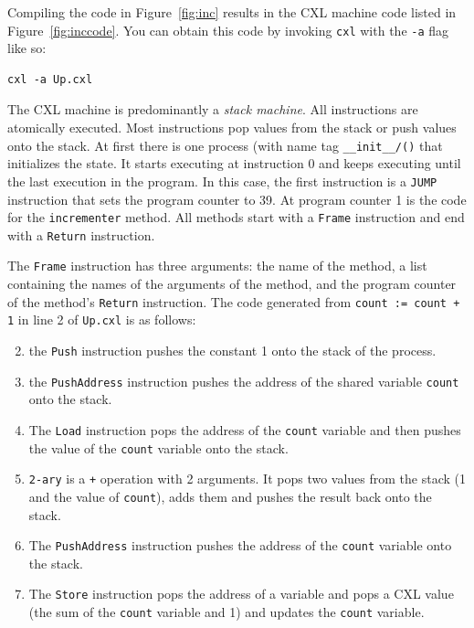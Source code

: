 \documentclass{report}
\newenvironment{code}{
\tcolorbox
}{
\endtcolorbox
}
\begin{document}
Compiling the code in Figure~\ref{fig:inc} results in the CXL machine code
listed in Figure~\ref{fig:inccode}.
You can obtain this code by invoking \texttt{cxl} with the \texttt{-a} flag
like so:
\begin{code}
\begin{verbatim}
cxl -a Up.cxl
\end{verbatim}
\end{code}
The CXL machine is predominantly a \emph{stack machine}.
All instructions are atomically executed.
Most instructions pop values from the stack or push values onto the stack.
At first there is one process (with name tag \texttt{\_\_init\_\_/()}
that initializes the state.
It starts executing at instruction 0 and keeps executing until the last
execution in the program.
In this case, the first instruction is a \texttt{JUMP} instruction that sets the
program counter to 39.
At program counter 1 is the code for the \texttt{incrementer} method.
All methods start with a \texttt{Frame} instruction and end with a \texttt{Return}
instruction.

The \texttt{Frame} instruction has three arguments: the name of the method,
a list containing the names of the arguments of the method, and
the program counter of the method's \texttt{Return} instruction.
The code generated from \texttt{count := count + 1} in line 2 of
\texttt{Up.cxl} is as follows:

\begin{enumerate} \setcounter{enumi}{1}
\item the \texttt{Push} instruction pushes the constant 1
onto the stack of the process.
\item the \texttt{PushAddress} instruction pushes the address of
the shared variable \texttt{count} onto the stack.
\item The \texttt{Load} instruction pops the address of the
\texttt{count} variable and then pushes the value of the
\texttt{count} variable onto the stack.
\item \texttt{2-ary} is a \texttt{+} operation with 2 arguments.
It pops two values from the stack (1 and the value of \texttt{count}),
adds them and pushes the result back onto the stack.
\item The \texttt{PushAddress} instruction pushes the address of the \texttt{count}
variable onto the stack.
\item The \texttt{Store} instruction pops the address of a variable and pops
a CXL value (the sum of the \texttt{count} variable and 1) and updates the
\texttt{count} variable.
\end{enumerate}
\end{document}
